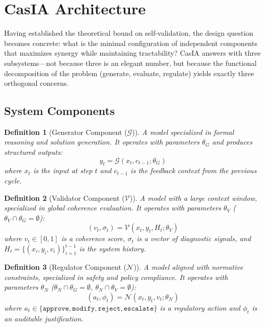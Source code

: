 \documentclass[11pt,a4paper]{article}
\newtheorem{definition}{Definition}[section]
\theoremstyle{remark}
\begin{document}
\section{CasIA Architecture}
\label{sec:architecture}

Having established the theoretical bound on self-validation, the design question becomes concrete: what is the minimal configuration of independent components that maximizes synergy while maintaining tractability? CasIA answers with three subsystems---not because three is an elegant number, but because the functional decomposition of the problem (generate, evaluate, regulate) yields exactly three orthogonal concerns.

\subsection{System Components}

\begin{definition}[Generator Component ($\mathcal{G}$)]
\label{def:generator}
A model specialized in formal reasoning and solution generation. It operates with parameters $\theta_G$ and produces structured outputs:
\begin{equation}
  y_t = \mathcal{G}(x_t, c_{t-1}; \theta_G)
\end{equation}
where $x_t$ is the input at step $t$ and $c_{t-1}$ is the feedback context from the previous cycle.
\end{definition}

\begin{definition}[Validator Component ($\mathcal{V}$)]
\label{def:validator}
A model with a large context window, specialized in global coherence evaluation. It operates with parameters $\theta_V$ ($\theta_V \cap \theta_G = \emptyset$):
\begin{equation}
  (v_t, \sigma_t) = \mathcal{V}(x_t, y_t, H_t; \theta_V)
\end{equation}
where $v_t \in [0, 1]$ is a coherence score, $\sigma_t$ is a vector of diagnostic signals, and $H_t = \{(x_i, y_i, v_i)\}_{i=1}^{t-1}$ is the system history.
\end{definition}

\begin{definition}[Regulator Component ($\mathcal{N}$)]
\label{def:regulator}
A model aligned with normative constraints, specialized in safety and policy compliance. It operates with parameters $\theta_N$ ($\theta_N \cap \theta_G = \emptyset$, $\theta_N \cap \theta_V = \emptyset$):
\begin{equation}
  (a_t, \phi_t) = \mathcal{N}(x_t, y_t, v_t; \theta_N)
\end{equation}
where $a_t \in \{\texttt{approve}, \texttt{modify}, \texttt{reject}, \texttt{escalate}\}$ is a regulatory action and $\phi_t$ is an auditable justification.
\end{definition}
\end{document}
